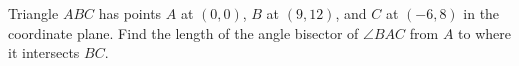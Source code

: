 Triangle $ABC$ has points $A$ at $\left(0,0\right)$, $B$ at $\left(9,12\right)$, and $C$ at $\left(-6,8\right)$ in the coordinate plane. Find the length of the angle bisector of $\angle{BAC}$ from $A$ to where it intersects $BC$.
